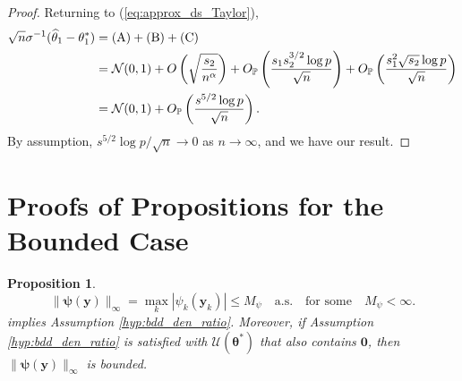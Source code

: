 \documentclass[11pt]{article}
\numberwithin{equation}{section}
\numberwithin{theorem}{section}
\def\faty{\boldsymbol{y}}
\def\fattheta{\boldsymbol{\theta}}
\def\fatpsi{\boldsymbol{\psi}}
\newtheorem{prop}[lem]{Proposition}
\theoremstyle{definition}
\theoremstyle{remark}
\begin{document}
\begin{proof}
Returning to (\ref{eq:approx_ds_Taylor}),
\begin{equation}
\begin{aligned}
\sqrt{n} \sigma^{-1} (\widehat\theta_1 - \theta_1^*)
&= \text{(A)} + \text{(B)} + \text{(C)} \\
&= \mathcal{N}(0,1) + O\left( \sqrt{\frac{s_2}{n^\alpha}} \right) + O_{\mathbb{P}}\left( \frac{s_1 s_2^{3/2} \log p}{\sqrt{n}} \right) + O_{\mathbb{P}}\left( \frac{s_1^2 \sqrt{s_2} \log p}{\sqrt{n}} \right) \\
&= \mathcal{N}(0,1) + O_{\mathbb{P}}\left( \frac{s^{5/2} \log p}{\sqrt{n}} \right).
\end{aligned}
\end{equation}
By assumption, $s^{5/2} \log p / \sqrt{n} \to 0$ as $n \to \infty$, and we have our result.
\end{proof}

\section{Proofs of Propositions for the Bounded Case} \label{sec:bdd_pfs}

\begin{prop}
\begin{equation}
\|\fatpsi(\faty)\|_\infty = \max_k |\psi_k(\faty_k)| \leq M_\psi \quad \text{a.s.} \quad \text{for some}\quad M_\psi < \infty.
\end{equation}
implies Assumption \ref{hyp:bdd_den_ratio}.
Moreover, if Assumption \ref{hyp:bdd_den_ratio} is satisfied with $\mathcal{U}(\fattheta^*)$ that also contains $\mathbf{0}$, then $\|\fatpsi(\faty)\|_\infty$ is bounded.
\end{prop}
\end{document}
